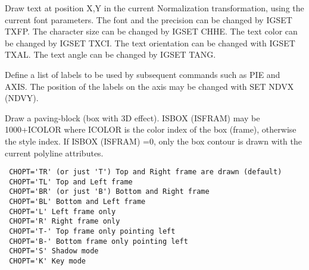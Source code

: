 \BEGARG
{}
\ENDARG
\BEGTEXT
Draw text at position X,Y
in the current Normalization transformation,
using the current font parameters.
The font and the precision can be changed by IGSET TXFP.
The character size can be changed by IGSET CHHE.
The text color can be changed by IGSET TXCI.
The text orientation can be changed with IGSET TXAL.
The text angle can be changed by IGSET TANG.
\ENDTEXT

\BEGARG
{}
\ENDARG
\BEGTEXT
Define a list of labels to be used by subsequent commands
such as PIE and AXIS.
The position of the labels on the axis may be changed with SET NDVX (NDVY).
\ENDTEXT

\BEGARG
{}
\ENDARG
\BEGTEXT
Draw a paving-block (box with 3D effect).
ISBOX (ISFRAM) may be 1000+ICOLOR where ICOLOR is the color index
of the box (frame), otherwise the style index.
If ISBOX (ISFRAM) =0, only the box contour is drawn with the current
polyline attributes.
\begin{verbatim}
 CHOPT='TR' (or just 'T') Top and Right frame are drawn (default)
 CHOPT='TL' Top and Left frame
 CHOPT='BR' (or just 'B') Bottom and Right frame
 CHOPT='BL' Bottom and Left frame
 CHOPT='L' Left frame only
 CHOPT='R' Right frame only
 CHOPT='T-' Top frame only pointing left
 CHOPT='B-' Bottom frame only pointing left
 CHOPT='S' Shadow mode
 CHOPT='K' Key mode
\end{verbatim}
\ENDTEXT

